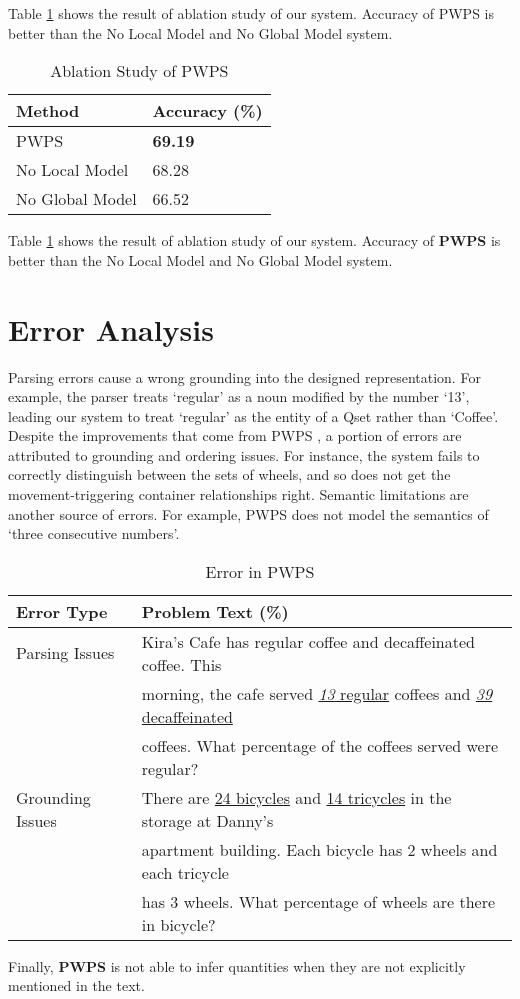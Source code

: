 \documentclass[document.tex]{subfiles}
\begin{document}
Table \ref{tab:ablation} shows the result of ablation study of our system. Accuracy of PWPS is better than the No Local Model and No Global Model system.
\begin{table}[H]
	\caption{Ablation Study of PWPS}
	\begin{center}
		\begin{tabular}{|l|l|}
			\hline
			Method & Accuracy (\%)\\
			\hline
			PWPS & \textbf{69.19}\\
			No Local Model & 68.28\\
			No Global Model & 66.52\\
			\hline
		\end{tabular}
	\end{center}
	\label{tab:ablation}
\end{table}
Table \ref{tab:ablation} shows the result of ablation study of our system. Accuracy of \textbf{PWPS} is better than the No Local Model and No Global Model system.
\section{Error Analysis}
Parsing errors cause a wrong grounding into the
designed representation. For example, the parser
treats ‘regular’ as a noun modified by the number
‘13’, leading our system to treat ‘regular’ as the entity of a Qset rather than ‘Coffee’. Despite the
improvements that come from PWPS , a portion of
errors are attributed to grounding and ordering issues. For instance, the system fails to correctly distinguish between the sets of wheels, and so does not get the movement-triggering container relationships right. Semantic limitations are another source of errors. For example, PWPS does not model the semantics of ‘three consecutive numbers’. 
\begin{table}[H]
	\caption{Error in PWPS}
	\begin{center}
		\begin{tabular}{|l|l|}
			\hline
			Error Type & Problem Text (\%)\\
			\hline
			Parsing Issues& Kira’s Cafe has regular coffee and decaffeinated coffee. This  \\
			&morning, the cafe served \underline{\textit{13} regular} coffees and \underline{\textit{39} decaffeinated}\\
			& coffees. What percentage of the coffees served were regular?\\
			\hline
			Grounding Issues & There are \underline{24 bicycles} and \underline{14 tricycles} in the storage at Danny’s\\
			& apartment building. Each bicycle has 2 wheels and each tricycle \\
			&has 3 wheels. What percentage of wheels are there in bicycle?\\
			\hline
		\end{tabular}
	\end{center}
	\label{tab:grounding}
\end{table}
Finally, \textbf{PWPS} is not able to infer quantities when they are not explicitly mentioned in the text. 
\end{document}
